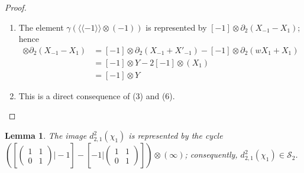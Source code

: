 \documentclass[11pt]{amsart}
\theoremstyle{definition}
\theoremstyle{plain}
\newtheorem{lem}[ntn]{Lemma}
\numberwithin{equation}{section}
\renewcommand{\SS}{\mathcal{S}}
\newcommand{\lan}{\langle}
\newcommand{\ran}{\rangle}
\newcommand{\Lan}{\langle \! \langle}
\newcommand{\Ran}{\rangle \! \rangle}
\newcommand{\id}{{\rm id}}
\newcommand{\im}{{\rm im}}
\newcommand{\mtxx}[4]
{\left(\!\!
\begin{array}{cc}
\!\!#1 & \!\!#2\\
\!\!#3 & \!\!#4
\end{array}\!\!
\right)}
\begin{document}
\begin{proof}
\begin{enumerate}
    \[
    [a]\otimes Y=d_2\otimes\id(([w|a]-[a^{-1}|w]+[a^{-1}|a])\otimes(\pmb{\infty},\pmb{0}))
    \]
    Applying $\id\otimes\partial_1$, we obtain, modulo $\im(d_3\otimes\id)$,
    \[
    \begin{split}
        d^2_{2,1}(\alpha(\lan a\ran))&=\{w([w|a]-[a^{-1}|w]+[a^{-1}|a])-([w|a]-[a^{-1}|w]+[a^{-1}|a])\}\otimes(\pmb{\infty})\\
        &=([-1|a]-[a|-1])\otimes(\pmb{\infty})
    \end{split}
    \]
    where the last line is obtained by adding the trivial element
    \[
    d_3\otimes\id(\{-[w|w|a]+[w|a^{-1}|a]-[w|a^{-1}|a]-[a|w|w]+[a|w|a]-[a|a^{-1}|w]-[a^{-1}|a|a^{-1}]\}\otimes(\pmb{\infty}))
    \]
    \item The element $\gamma(\Lan -1\Ran\otimes(-1))$ is represented by $[-1]\otimes\partial_2(X_{-1}-X_1)$; hence
    \begin{align*}
        [-1]\otimes\partial_2(X_{-1}-X_1)&=[-1]\otimes\partial_2(X_{-1}+X'_{-1})-[-1]\otimes\partial_2(wX_1+X_1)\\
        &=[-1]\otimes Y - 2[-1]\otimes(X_1)\\
        &=[-1]\otimes Y
    \end{align*}
    \item This is a direct consequence of (3) and (6).
\end{enumerate}
\end{proof}
\begin{lem}\label{d2-chi}
    The image $d^2_{2,1}(\chi_1)$ is represented by the cycle $(\left[\mtxx{1}{1}{0}{1}\bigg|-1\right]-\left[-1\bigg|\mtxx{1}{1}{0}{1}\right])\otimes(\pmb{\infty})$; consequently, $d^2_{2,1}(\chi_1)\in\SS_2$.
\end{lem}
\end{document}
